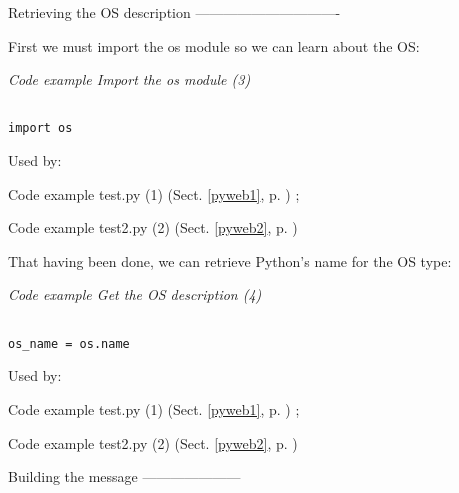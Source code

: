 Retrieving the OS description
-------------------------------

First we must import the os module so we can learn about the OS:

\label{pyweb3}
    \begin{flushleft}
    \textit{Code example Import the os module (3)}
    \begin{Verbatim}[commandchars=\\\{\},codes={\catcode`$=3\catcode`^=7},frame=single]

import os

    \end{Verbatim}
    
    \footnotesize
    Used by:
    \begin{list}{}{}
    
    \item Code example test.py (1) (Sect. \ref{pyweb1}, p. \pageref{pyweb1})
; 
    \item Code example test2.py (2) (Sect. \ref{pyweb2}, p. \pageref{pyweb2})

    \end{list}
    \normalsize
    
    \end{flushleft}


That having been done, we can retrieve Python's name for the OS type:

\label{pyweb4}
    \begin{flushleft}
    \textit{Code example Get the OS description (4)}
    \begin{Verbatim}[commandchars=\\\{\},codes={\catcode`$=3\catcode`^=7},frame=single]

os_name = os.name

    \end{Verbatim}
    
    \footnotesize
    Used by:
    \begin{list}{}{}
    
    \item Code example test.py (1) (Sect. \ref{pyweb1}, p. \pageref{pyweb1})
; 
    \item Code example test2.py (2) (Sect. \ref{pyweb2}, p. \pageref{pyweb2})

    \end{list}
    \normalsize
    
    \end{flushleft}


Building the message
---------------------

